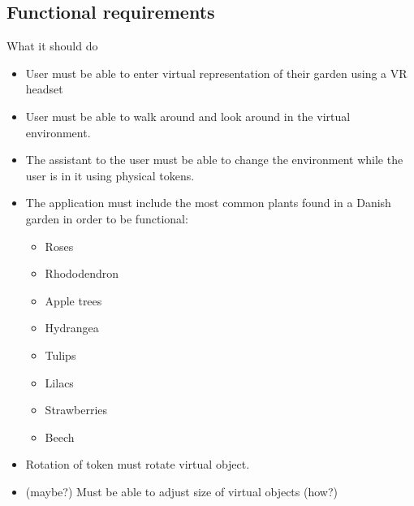 				\subsection{Functional requirements}
					What it should do\\
					\begin{itemize}
						\item User must be able to enter virtual representation of their garden using a VR headset
						\item User must be able to walk around and look around in the virtual environment.
						\item The assistant to the user must be able to change the environment while the user is in it using physical tokens.
						\item The application must include the most common plants found in a Danish garden in order to be functional:
						\begin{itemize}
							\item Roses
							\item Rhododendron
							\item Apple trees
							\item Hydrangea
							\item Tulips
							\item Lilacs
							\item Strawberries
							\item Beech
						\end{itemize}
						\item Rotation of token must rotate virtual object.
						\item (maybe?) Must be able to adjust size of virtual objects (how?)
					\end{itemize}
					
